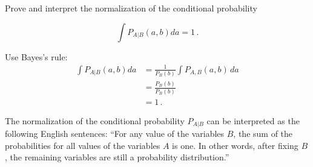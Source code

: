 

Prove and interpret the normalization of the conditional probability

\begin{equation*}
\int P_{A|B}(a, b) da = 1 \, .
\end{equation*}


Use Bayes's rule:
\begin{align*}
\int P_{A|B}(a, b) da
&= \frac{1}{P_B(b)} \int P_{A,B}(a, b) \, da \\
&= \frac{P_B(b)}{P_B(b)} \\
&= 1 \, .
\end{align*}

The normalization of the conditional probability $P_{A|B}$ can be interpreted as the following English sentences: ``For any value of the variables $B$, the sum of the probabilities for all values of the variables $A$ is one. In other words, after fixing $B$, the remaining variables are still a probability distribution.''

